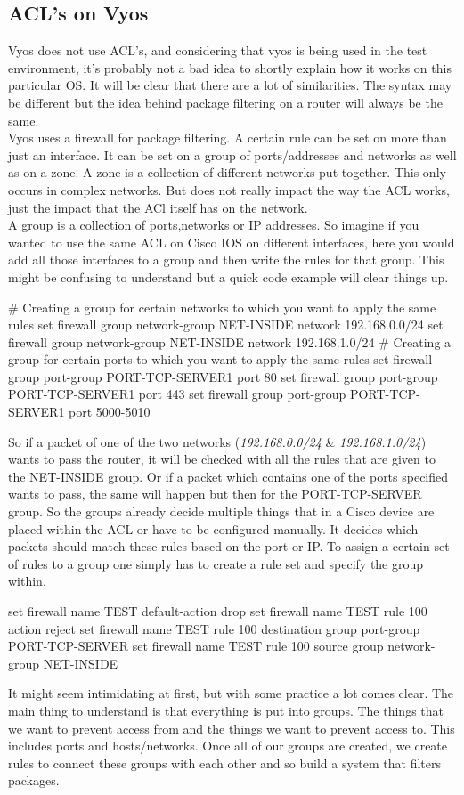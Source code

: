 \subsection{ACL's on Vyos}
Vyos does not use ACL's, and considering that vyos is being used in the test environment, it's probably not a bad idea to shortly explain how it works on this particular OS. It will be clear that there are a lot of similarities. The syntax may be different but the idea behind package filtering on a router will always be the same.\\
Vyos uses a firewall for package filtering. A certain rule can be set on more than just an interface. It can be set on a group of ports/addresses and networks as well as on a zone.
A zone is a collection of different networks put together. This only occurs in complex networks. But does not really impact the way the ACL works, just the impact that the ACl itself has on the network.\\
A group is a collection of ports,networks or IP addresses. So imagine if you wanted to use the same ACL on Cisco IOS on different interfaces, here you would add all those interfaces to a group and then write the rules for that group. This might be confusing to understand but a quick code example will clear things up.
\begin{cisco}[title=Creating firewall groups]
# Creating a group for certain networks to which you want to apply the same rules
set firewall group network-group NET-INSIDE network 192.168.0.0/24
set firewall group network-group NET-INSIDE network 192.168.1.0/24
# Creating a group for certain ports to which you want to apply the same rules
set firewall group port-group PORT-TCP-SERVER1 port 80
set firewall group port-group PORT-TCP-SERVER1 port 443
set firewall group port-group PORT-TCP-SERVER1 port 5000-5010
\end {cisco}
So if a packet of one of the two networks (\textit{192.168.0.0/24} \& \textit{192.168.1.0/24}) wants to pass the router, it will be checked with all the rules that are given to the NET-INSIDE group. Or if a packet which contains one of the ports specified wants to pass, the same will happen but then for the PORT-TCP-SERVER group. So the groups already decide multiple things that in a Cisco  device are placed within the ACL or have to be configured manually. It decides which packets should match these rules based on the port or IP. To assign a certain set of rules to a group one simply has to create a rule set and specify the group within.
\begin{cisco}[title=Configuring a rule set]
set firewall name TEST default-action drop
set firewall name TEST rule 100 action reject
set firewall name TEST rule 100 destination group port-group PORT-TCP-SERVER
set firewall name TEST rule 100 source group network-group NET-INSIDE
\end{cisco}
It might seem intimidating at first, but with some practice a lot comes clear. The main thing to understand is that everything is put into groups. The things that we want to prevent access from and the things we want to prevent access to. This includes ports and hosts/networks. Once all of our groups are created, we create rules to connect these groups with each other and so build a system that filters packages.
